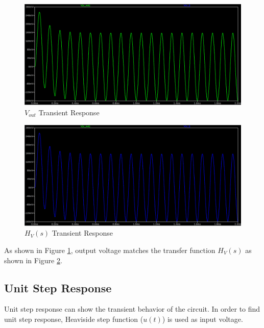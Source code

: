 \newpage
\thispagestyle{plain}

\begin{figure}[h]
    \centering
    \includegraphics[width=1\textwidth]{assets/rlc-sin-transient-out.png}
    \caption{$V_{out}$ Transient Response}
    \label{fig:rlc_v_out_transient}
\end{figure}

\begin{figure}[h]
    \centering
    \includegraphics[width=1\textwidth]{assets/rlc-sin-transient-laplace.png}
    \caption{$H_{V}(s)$ Transient Response}
    \label{fig:rlc_v_laplace_transient}
\end{figure}

As shown in Figure \ref{fig:rlc_v_out_transient}, output voltage matches the transfer function $H_{V}(s)$ as shown in Figure \ref{fig:rlc_v_laplace_transient}.

\newpage
\thispagestyle{plain}

\subsection{Unit Step Response}
Unit step response can show the transient behavior of the circuit. In order to find unit step response, Heaviside step function ($u(t)$) is used as input voltage.

